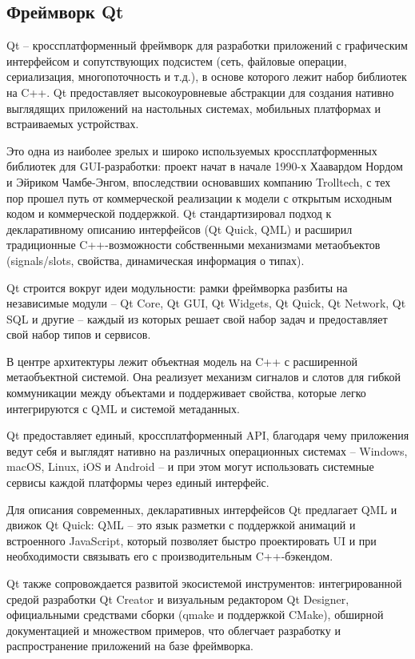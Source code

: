 \subsection{Фреймворк Qt}

Qt -- кроссплатформенный фреймворк для разработки приложений с графическим интерфейсом и сопутствующих подсистем (сеть, файловые операции, сериализация, многопоточность и т.д.), в основе которого лежит набор библиотек на C++. Qt предоставляет высокоуровневые абстракции для создания нативно выглядящих приложений на настольных системах, мобильных платформах и встраиваемых устройствах.

Это одна из наиболее зрелых и широко используемых кроссплатформенных библиотек для GUI-разработки: проект начат в начале 1990-х Хаавардом Нордом и Эйриком Чамбе-Энгом, впоследствии основавших компанию Trolltech, с тех пор прошел путь от коммерческой реализации к модели с открытым исходным кодом и коммерческой поддержкой. Qt стандартизировал подход к декларативному описанию интерфейсов (Qt Quick, QML) и расширил традиционные C++-возможности собственными механизмами метаобъектов (signals/slots, свойства, динамическая информация о типах).

Qt строится вокруг идеи модульности: рамки фреймворка разбиты на независимые модули -- Qt Core, Qt GUI, Qt Widgets, Qt Quick, Qt Network, Qt SQL и другие -- каждый из которых решает свой набор задач и предоставляет свой набор типов и сервисов. 

В центре архитектуры лежит объектная модель на C++ с расширенной метаобъектной системой. Она реализует механизм сигналов и слотов для гибкой коммуникации между объектами и поддерживает свойства, которые легко интегрируются с QML и системой метаданных. 

Qt предоставляет единый, кроссплатформенный API, благодаря чему приложения ведут себя и выглядят нативно на различных операционных системах -- Windows, macOS, Linux, iOS и Android -- и при этом могут использовать системные сервисы каждой платформы через единый интерфейс.
 
Для описания современных, декларативных интерфейсов Qt предлагает QML и движок Qt Quick: QML -- это язык разметки с поддержкой анимаций и встроенного JavaScript, который позволяет быстро проектировать UI и при необходимости связывать его с производительным C++‑бэкендом.

Qt также сопровождается развитой экосистемой инструментов: интегрированной средой разработки Qt Creator и визуальным редактором Qt Designer, официальными средствами сборки (qmake и поддержкой CMake), обширной документацией и множеством примеров, что облегчает разработку и распространение приложений на базе фреймворка.

